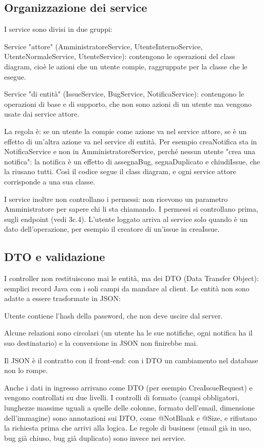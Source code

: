 \subsection{Organizzazione dei service}
I service sono divisi in due gruppi: 

Service "attore" (AmministratoreService, UtenteInternoService, UtenteNormaleService, UtenteService): contengono le operazioni del class diagram, 
cioè le azioni che un utente compie, raggruppate per la classe che le esegue. 

Service "di entità" (IssueService, BugService, NotificaService): contengono le operazioni 
di base e di supporto, che non sono azioni di un utente ma vengono usate dai service attore. 

La regola è: se un utente la compie come azione va nel service attore, se è un effetto 
di un'altra azione va nel service di entità. Per esempio creaNotifica sta in NotificaService 
e non in AmministratoreService, perché nessun utente "crea una notifica": la notifica è un 
effetto di assegnaBug, segnaDuplicato e chiudiIssue, che la riusano tutti. Così il codice 
segue il class diagram, e ogni service attore corrisponde a una sua classe. 

I service inoltre non controllano i permessi: non ricevono un parametro Amministratore 
per sapere chi li sta chiamando. I permessi si controllano prima, sugli endpoint (vedi 3c.4).
 L'utente loggato arriva al service solo quando è un dato dell'operazione, per esempio il 
 creatore di un'issue in creaIssue.

\subsection{DTO e validazione}
I controller non restituiscono mai le entità, ma dei DTO (Data Transfer Object): semplici 
record Java con i soli campi da mandare al client. Le entità non sono adatte a essere 
trasformate in JSON: 

 Utente contiene l'hash della password, che non deve uscire dal server. 

\noindent Alcune relazioni sono circolari (un utente ha le sue notifiche, ogni notifica 
ha il suo destinatario) e la conversione in JSON non finirebbe mai. 

Il JSON è il contratto con il front-end: con i DTO un cambiamento nel 
database non lo rompe. 

Anche i dati in ingresso arrivano come DTO (per esempio CreaIssueRequest) e 
vengono controllati su due livelli. I controlli di formato (campi obbligatori, 
lunghezze massime uguali a quelle delle colonne, formato dell'email, dimensione 
dell'immagine) sono annotazioni sui DTO, come @NotBlank e @Size, e rifiutano la 
richiesta prima che arrivi alla logica. Le regole di business (email già in uso, 
bug già chiuso, bug già duplicato) sono invece nei service.


